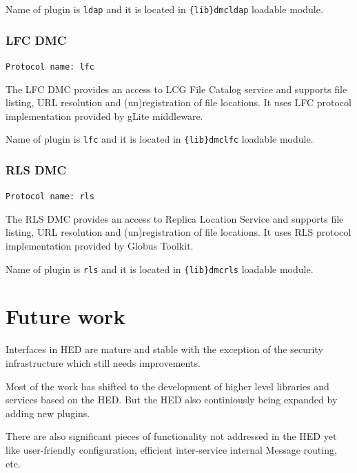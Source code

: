 \documentclass{book}
\begin{document}
Name of plugin is \texttt{ldap} and it is located in \texttt{\{lib\}dmcldap} loadable module.


\subsection{LFC DMC}

\texttt{Protocol name: lfc}

The LFC DMC provides an access to LCG File Catalog service and supports file listing, URL resolution and (un)registration of file locations. It uses LFC protocol implementation provided by gLite middleware.

Name of plugin is \texttt{lfc} and it is located in \texttt{\{lib\}dmclfc} loadable module.


\subsection{RLS DMC}

\texttt{Protocol name: rls}

The RLS DMC provides an access to Replica Location Service and supports file listing, URL resolution and (un)registration of file locations. It uses RLS protocol implementation provided by Globus Toolkit.

Name of plugin is \texttt{rls} and it is located in \texttt{\{lib\}dmcrls} loadable module.


\chapter{Future work}

Interfaces in HED are mature and stable with the exception of the security infrastructure which still needs improvements.

Most of the work has shifted to the development of higher level libraries and services based on the HED. But the HED also continiously being expanded by adding new plugins.

There are also significant pieces of functionality not addressed in the HED yet like user-friendly configuration, efficient inter-service internal Message routing, etc.



\end{document}
